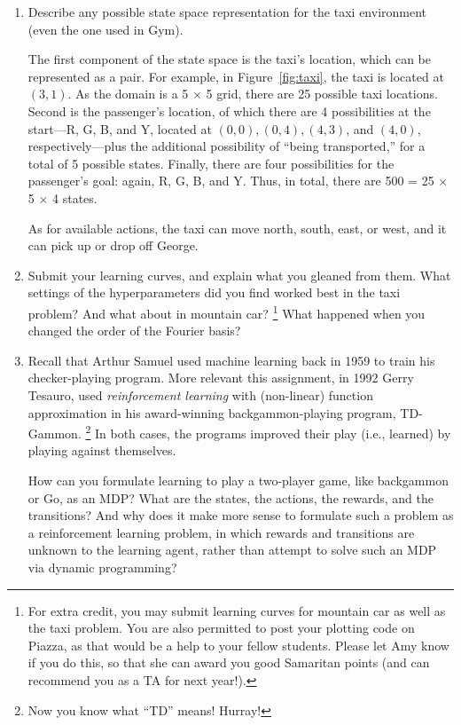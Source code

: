 \documentclass{article}
\begin{document}
\begin{enumerate}

\item
  Describe any possible state space representation for the taxi environment
  (even the one used in Gym).
  
The first component of the state space is the taxi's location,
which can be represented as
a pair.  For example, in Figure~\ref{fig:taxi}, the taxi is located at
$(3,1)$.  As the domain is a 5 $\times$ 5 grid, there are 25 possible taxi locations.
%
Second is the passenger's location, of which there are 4 possibilities
at the start---R, G, B, and Y, located at $(0,0), (0,4), (4,3)$, and
$(4,0)$, respectively---plus the additional possibility of ``being
transported,'' for a total of 5 possible states.
%
Finally, there are four possibilities for the passenger's goal: again,
R, G, B, and Y.
%
Thus, in total, there are 500 = 25 $\times$ 5 $\times$ 4 states.

As for available actions, the taxi can move north, south, east, or
west, and it can pick up or drop off George.
\fi

\item
  Submit your learning curves, and explain what you gleaned from them.
  What settings of the hyperparameters did you find worked best in the taxi problem?
  And what about in mountain car?%
\footnote{For extra credit, you may submit learning curves for mountain car as well as the taxi problem.
You are also permitted to post your plotting code on Piazza, as that would be a help to your fellow students.
Please let Amy know if you do this, so that she can award you good Samaritan points (and can recommend you as a TA for next year!).}
  What happened when you changed the order of the Fourier basis?

\item
  Recall that Arthur Samuel used machine learning back in 1959 to
  train his checker-playing program.  More relevant this assignment,
  in 1992 Gerry Tesauro, used \emph{reinforcement learning\/} with
  (non-linear) function approximation in his award-winning
  backgammon-playing program, TD-Gammon.%
  \footnote{Now you know what ``TD'' means! Hurray!}
  In both cases, the programs improved their play (i.e., learned)
  by playing against themselves.
  
  How can you formulate learning to play a two-player game, like
  backgammon or Go,
  as an MDP?  What are the states, the actions, the rewards, and the
  transitions?  And why does it make more sense to formulate such a
  problem as a reinforcement learning problem, in which rewards and
  transitions are unknown to the learning agent, rather than attempt
  to solve such an MDP via dynamic programming?
\end{enumerate}
\end{document}
